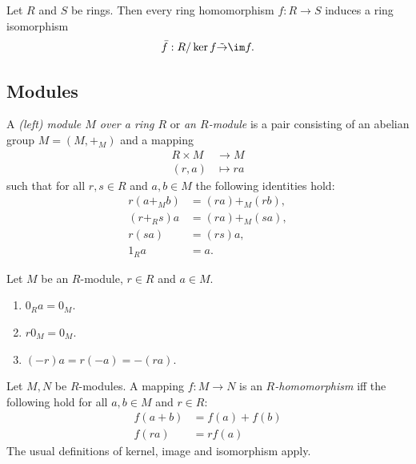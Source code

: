 \documentclass{article}
\begin{document}
\begin{theorem}
	Let $R$ and $S$ be rings. Then every ring homomorphism $f:R\to S$ induces a ring isomorphism
	\begin{align*}
		\bar f:R/\ker f \tilde\to \im f.
	\end{align*}
\end{theorem}

\subsection{Modules}

\begin{definition}
	A \emph{(left) module $M$ over a ring $R$} or \emph{an $R$-module} is a pair consisting of an
	abelian group $M=(M,+_M)$ and a mapping
	\begin{align*}
		R\times M & \to M      \\
		(r,a)     & \mapsto ra
	\end{align*}
	such that for all $r,s\in R$ and $a,b\in M$ the following identities hold:
	\begin{align*}
		r(a +_M b) & = (ra) +_M (rb), \\
		(r+_Rs)a   & = (ra) +_M (sa), \\
		r(sa)      & = (rs)a,         \\
		1_Ra       & = a.
	\end{align*}
\end{definition}

\begin{lemma}[Lemma 3.7.8]
	Let $M$ be an $R$-module, $r\in R$ and $a\in M$.
	\begin{enumerate}
		\item $0_Ra=0_M$.
		\item $r0_M=0_M$.
		\item $(-r)a=r(-a)=-(ra)$.
	\end{enumerate}
\end{lemma}

\begin{definition}
	Let $M,N$ be $R$-modules. A mapping $f:M\to N$ is an \emph{$R$-homomorphism} iff the following
	hold for all $a,b\in M$ and $r\in R$:
	\begin{align*}
		f(a+b) & = f(a) + f(b) \\
		f(ra)  & = rf(a)
	\end{align*}
	The usual definitions of kernel, image and isomorphism apply.
\end{definition}
\end{document}
